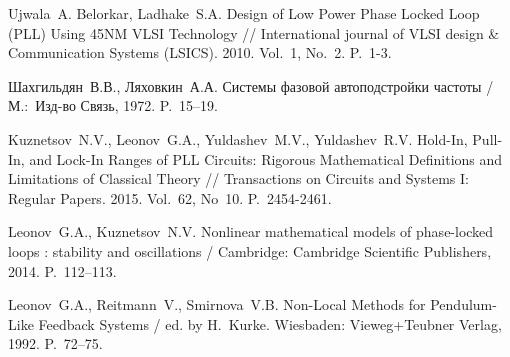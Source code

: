 \documentclass[a4paper,article,14pt]{extarticle}
\begin{document}
\begin{thebibliography}{20}
Ujwala~A. Belorkar, Ladhake~S.\:A. Design of Low Power Phase Locked Loop (PLL) Using 45NM VLSI Technology // International journal of VLSI design \& Communication Systems  (LSICS). 2010. Vol.~1, No.~2. P.~1-3.

  Шахгильдян~В.\:В., Ляховкин~А.\:А. Системы фазовой автоподстройки частоты / М.:~Изд-во Связь, 1972. P.~15--19.

 Kuznetsov~N.\:V., Leonov~G.\:A., Yuldashev~M.\:V., Yuldashev~R.\:V. Hold-In, Pull-In, and Lock-In Ranges of PLL Circuits: Rigorous Mathematical Definitions and Limitations of Classical Theory // Transactions on Circuits and Systems I: Regular Papers. 2015. Vol.~62, No~10. P.~2454-2461.
 
  Leonov~G.\:A., Kuznetsov~N.\:V. Nonlinear mathematical models of phase-locked loops : stability and oscillations / Cambridge: Cambridge Scientific Publishers, 2014. P.~112--113.

  Leonov~G.\:A., Reitmann~V., Smirnova~V.\:B. Non-Local Methods for Pendulum-Like Feedback Systems / ed. by H.~Kurke. Wiesbaden: Vieweg+Teubner Verlag, 1992. P.~72--75.

\end{thebibliography}
\end{document}
